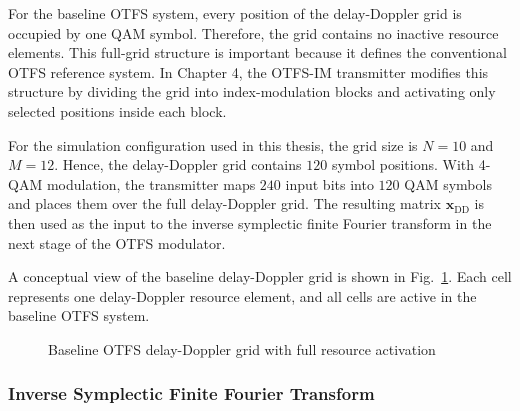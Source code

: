 For the baseline OTFS system, every position of the delay-Doppler grid is occupied by one QAM symbol. Therefore, the grid contains no inactive resource elements. This full-grid structure is important because it defines the conventional OTFS reference system. In Chapter 4, the OTFS-IM transmitter modifies this structure by dividing the grid into index-modulation blocks and activating only selected positions inside each block.

For the simulation configuration used in this thesis, the grid size is \(N=10\) and \(M=12\). Hence, the delay-Doppler grid contains \(120\) symbol positions. With 4-QAM modulation, the transmitter maps \(240\) input bits into \(120\) QAM symbols and places them over the full delay-Doppler grid. The resulting matrix \(\mathbf{x}_{\mathrm{DD}}\) is then used as the input to the inverse symplectic finite Fourier transform in the next stage of the OTFS modulator.

A conceptual view of the baseline delay-Doppler grid is shown in Fig.~\ref{fig:baseline_dd_grid}. Each cell represents one delay-Doppler resource element, and all cells are active in the baseline OTFS system.

\begin{figure}[H]
    \centering
    \caption{Baseline OTFS delay-Doppler grid with full resource activation}
    \label{fig:baseline_dd_grid}
\end{figure}

\subsubsection{Inverse Symplectic Finite Fourier Transform}

